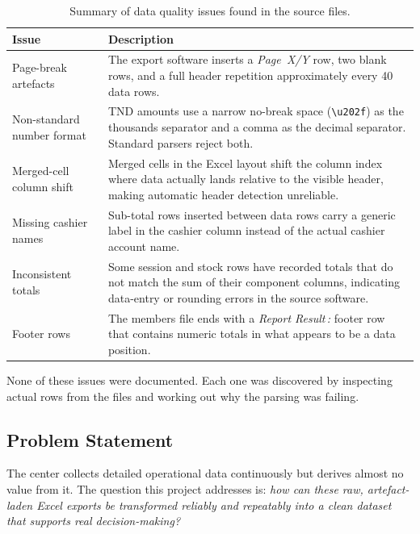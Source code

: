 \documentclass[12pt, a4paper]{report}
\begin{document}
\begin{table}[H]
  \centering
  \caption{Summary of data quality issues found in the source files.}
  \begin{tabular}{p{3.5cm} p{9.5cm}}
    \toprule
    \textbf{Issue} & \textbf{Description} \\
    \midrule
    Page-break artefacts
      & The export software inserts a \textit{Page~X/Y} row, two blank rows, and
        a full header repetition approximately every 40 data rows. \\[4pt]
    Non-standard number format
      & TND amounts use a narrow no-break space (\texttt{\textbackslash u202f})
        as the thousands separator and a comma as the decimal separator. Standard
        parsers reject both. \\[4pt]
    Merged-cell column shift
      & Merged cells in the Excel layout shift the column index where data actually
        lands relative to the visible header, making automatic header detection
        unreliable. \\[4pt]
    Missing cashier names
      & Sub-total rows inserted between data rows carry a generic label in the
        cashier column instead of the actual cashier account name. \\[4pt]
    Inconsistent totals
      & Some session and stock rows have recorded totals that do not match the
        sum of their component columns, indicating data-entry or rounding errors
        in the source software. \\[4pt]
    Footer rows
      & The members file ends with a \textit{Report Result\,:} footer row that
        contains numeric totals in what appears to be a data position. \\
    \bottomrule
  \end{tabular}
\end{table}

None of these issues were documented. Each one was discovered by inspecting actual
rows from the files and working out why the parsing was failing.

\subsection{Problem Statement}

The center collects detailed operational data continuously but derives almost no
value from it. The question this project addresses is: \textit{how can these raw,
artefact-laden Excel exports be transformed reliably and repeatably into a clean
dataset that supports real decision-making?}
\end{document}
